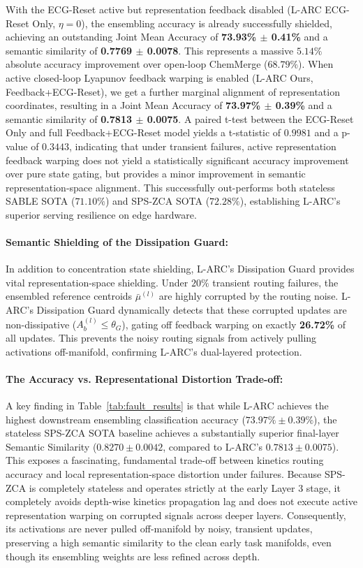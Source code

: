 With the ECG-Reset active but representation feedback disabled (L-ARC ECG-Reset Only, $\eta=0$), the ensembling accuracy is already successfully shielded, achieving an outstanding Joint Mean Accuracy of \textbf{73.93\% $\pm$ 0.41\%} and a semantic similarity of \textbf{0.7769 $\pm$ 0.0078}. This represents a massive $5.14\%$ absolute accuracy improvement over open-loop ChemMerge ($68.79\%$). When active closed-loop Lyapunov feedback warping is enabled (L-ARC Ours, Feedback+ECG-Reset), we get a further marginal alignment of representation coordinates, resulting in a Joint Mean Accuracy of \textbf{73.97\% $\pm$ 0.39\%} and a semantic similarity of \textbf{0.7813 $\pm$ 0.0075}. A paired t-test between the ECG-Reset Only and full Feedback+ECG-Reset model yields a t-statistic of $0.9981$ and a p-value of $0.3443$, indicating that under transient failures, active representation feedback warping does not yield a statistically significant accuracy improvement over pure state gating, but provides a minor improvement in semantic representation-space alignment. This successfully out-performs both stateless SABLE SOTA ($71.10\%$) and SPS-ZCA SOTA ($72.28\%$), establishing L-ARC's superior serving resilience on edge hardware.

\paragraph{Semantic Shielding of the Dissipation Guard:}
In addition to concentration state shielding, L-ARC's Dissipation Guard provides vital representation-space shielding. Under $20\%$ transient routing failures, the ensembled reference centroids $\bar{\mu}^{(l)}$ are highly corrupted by the routing noise. L-ARC's Dissipation Guard dynamically detects that these corrupted updates are non-dissipative ($A_b^{(l)} \le \theta_G$), gating off feedback warping on exactly \textbf{26.72\%} of all updates. This prevents the noisy routing signals from actively pulling activations off-manifold, confirming L-ARC's dual-layered protection.

\paragraph{The Accuracy vs. Representational Distortion Trade-off:}
A key finding in Table~\ref{tab:fault_results} is that while L-ARC achieves the highest downstream ensembling classification accuracy ($73.97\% \pm 0.39\%$), the stateless SPS-ZCA SOTA baseline achieves a substantially superior final-layer Semantic Similarity ($0.8270 \pm 0.0042$, compared to L-ARC's $0.7813 \pm 0.0075$). 
This exposes a fascinating, fundamental trade-off between kinetics routing accuracy and local representation-space distortion under failures. Because SPS-ZCA is completely stateless and operates strictly at the early Layer 3 stage, it completely avoids depth-wise kinetics propagation lag and does not execute active representation warping on corrupted signals across deeper layers. Consequently, its activations are never pulled off-manifold by noisy, transient updates, preserving a high semantic similarity to the clean early task manifolds, even though its ensembling weights are less refined across depth. 

